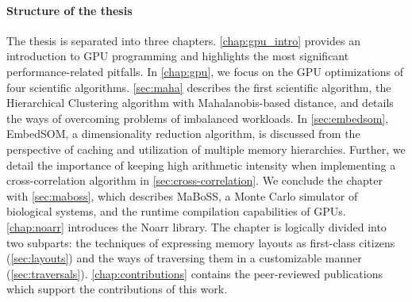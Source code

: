 \paragraph{Structure of the thesis}

The thesis is separated into three chapters. \cref{chap:gpu_intro} provides an introduction to GPU programming and highlights the most significant performance-related pitfalls. In \cref{chap:gpu}, we focus on the GPU optimizations of four scientific algorithms. \cref{sec:maha} describes the first scientific algorithm, the Hierarchical Clustering algorithm with Mahalanobis-based distance, and details the ways of overcoming problems of imbalanced workloads. In \cref{sec:embedsom}, EmbedSOM, a dimensionality reduction algorithm, is discussed from the perspective of caching and utilization of multiple memory hierarchies. Further, we detail the importance of keeping high arithmetic intensity when implementing a cross-correlation algorithm in \cref{sec:cross-correlation}. We conclude the chapter with \cref{sec:maboss}, which describes MaBoSS, a Monte Carlo simulator of biological systems, and the runtime compilation capabilities of GPUs. \cref{chap:noarr} introduces the Noarr library. The chapter is logically divided into two subparts: the techniques of expressing memory layouts as first-class citizens (\cref{sec:layouts}) and the ways of traversing them in a customizable manner (\cref{sec:traversals}). \cref{chap:contributions} contains the peer-reviewed publications which support the contributions of this work.
